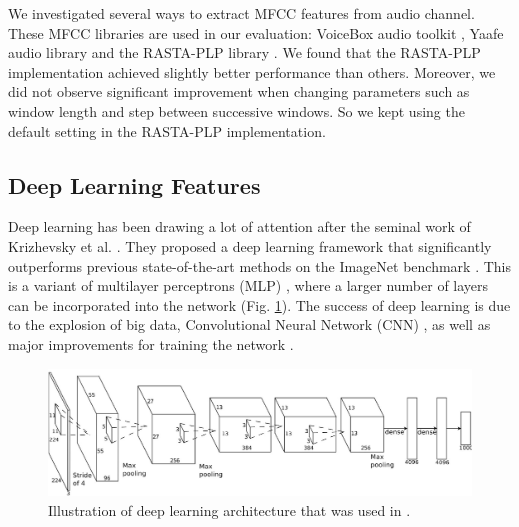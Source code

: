 We investigated several ways to extract MFCC features from audio channel. These MFCC libraries are used in our evaluation: VoiceBox audio toolkit \cite{voicebox}, Yaafe audio library \cite{mathieu2010yaafe} and the RASTA-PLP library \cite{Ellis05-rastamat}. We found that the RASTA-PLP implementation achieved slightly better performance than others. Moreover, we did not observe significant improvement when changing parameters such as window length and step between successive windows. So we kept using the default setting in the RASTA-PLP implementation.

\subsection{Deep Learning Features}
Deep learning has been drawing a lot of attention after the seminal work of Krizhevsky et al. \cite{krizhevsky2012imagenet}. They proposed a deep learning framework that significantly outperforms previous state-of-the-art methods on the ImageNet benchmark \cite{deng2009imagenet}. This is a variant of multilayer perceptrons (MLP) \cite{rumelhart1985learning}, where a larger number of layers can be incorporated into the network (Fig. \ref{c2_deeplearning}). The success of deep learning is due to the explosion of big data, Convolutional Neural Network (CNN) \cite{lecun1995convolutional,lecun1998gradient}, as well as major improvements for training the network \cite{hinton2006fast,bengio2007greedy}.
\begin{figure}[!h]
	\centering
	\includegraphics[width=1\textwidth]{deeplearning.png}
	\caption{Illustration of deep learning architecture that was used in \cite{krizhevsky2012imagenet}.}
	\label{c2_deeplearning}
\end{figure}

